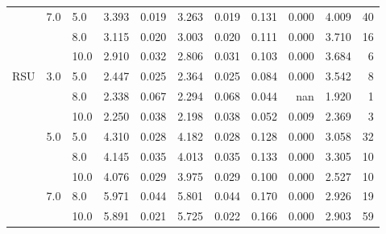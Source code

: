 \begin{tabular}{lllrrrrrrrr}
    & 7.0 & 5.0  &    3.393 &     0.019 &  3.263 &     0.019 &      0.131 &   0.000 &     4.009 &  40 \\
    &     & 8.0  &    3.115 &     0.020 &  3.003 &     0.020 &      0.111 &   0.000 &     3.710 &  16 \\
    &     & 10.0 &    2.910 &     0.032 &  2.806 &     0.031 &      0.103 &   0.000 &     3.684 &   6 \\
RSU & 3.0 & 5.0  &    2.447 &     0.025 &  2.364 &     0.025 &      0.084 &   0.000 &     3.542 &   8 \\
    &     & 8.0  &    2.338 &     0.067 &  2.294 &     0.068 &      0.044 &     nan &     1.920 &   1 \\
    &     & 10.0 &    2.250 &     0.038 &  2.198 &     0.038 &      0.052 &   0.009 &     2.369 &   3 \\
    & 5.0 & 5.0  &    4.310 &     0.028 &  4.182 &     0.028 &      0.128 &   0.000 &     3.058 &  32 \\
    &     & 8.0  &    4.145 &     0.035 &  4.013 &     0.035 &      0.133 &   0.000 &     3.305 &  10 \\
    &     & 10.0 &    4.076 &     0.029 &  3.975 &     0.029 &      0.100 &   0.000 &     2.527 &  10 \\
    & 7.0 & 8.0  &    5.971 &     0.044 &  5.801 &     0.044 &      0.170 &   0.000 &     2.926 &  19 \\
    &     & 10.0 &    5.891 &     0.021 &  5.725 &     0.022 &      0.166 &   0.000 &     2.903 &  59 \\
\bottomrule
\end{tabular}
